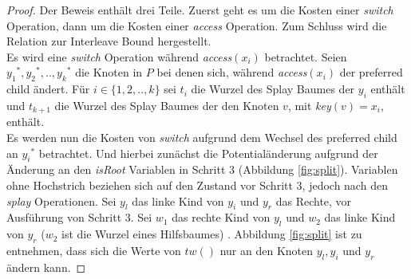 \documentclass[a4paper,12pt]{article}
\begin{document}
\begin{proof}
	Der Beweis enthält drei Teile. Zuerst geht es um die Kosten einer \textit{switch} Operation, dann um die Kosten einer  \textit{access} Operation. Zum Schluss wird die Relation zur Interleave Bound hergestellt.\\
	Es wird eine \textit{switch} Operation während \textit{access}$\left(x_i\right)$ betrachtet. Seien ${y_1}^*, {y_2}^*,..,{y_k}^*$ die Knoten in $P$ bei denen sich, während  \textit{access}$\left(x_i\right)$ der preferred child ändert. Für $i \in \{1, 2,.., k\}$ sei $t_i$ die Wurzel des Splay Baumes der $y_i$ enthält und $t_{k+1}$ die Wurzel des Splay Baumes der den Knoten $v$, mit \textit{key}$\left(v\right) = x_i$, enthält.\\
	Es werden nun die Kosten von \textit{switch} aufgrund dem Wechsel des preferred child an ${y_i}^*$ betrachtet. Und hierbei zunächst die Potentialänderung aufgrund der Änderung an den \textit{isRoot} Variablen in Schritt 3 (Abbildung \ref{fig:split}). Variablen ohne Hochstrich beziehen sich auf den Zustand vor Schritt 3, jedoch nach den \textit{splay} Operationen. Sei $y_l$ das linke Kind von $y_i$ und $y_r$ das Rechte, vor Ausführung von Schritt 3. Sei $w_1$ das rechte Kind von $y_l$ und $w_2$ das linke Kind von $y_r$  ($w_2$ ist die Wurzel eines Hilfsbaumes) . Abbildung \ref{fig:split} ist zu entnehmen, dass sich die Werte von $\mathit{tw}\left(\right)$ nur an den Knoten $y_l, y_i$ und $y_r$ ändern kann.
	 

\end{proof}
\end{document}
